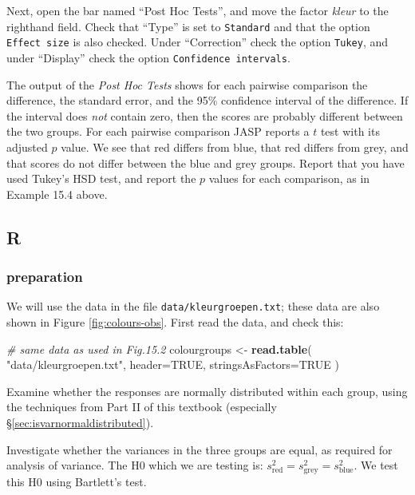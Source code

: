 \documentclass[
]{book}
\newenvironment{Shaded}{\begin{snugshade}}{\end{snugshade}}
\newcommand{\CommentTok}[1]{\textcolor[rgb]{0.56,0.35,0.01}{\textit{#1}}}
\newcommand{\DataTypeTok}[1]{\textcolor[rgb]{0.13,0.29,0.53}{#1}}
\newcommand{\KeywordTok}[1]{\textcolor[rgb]{0.13,0.29,0.53}{\textbf{#1}}}
\newcommand{\NormalTok}[1]{#1}
\newcommand{\OtherTok}[1]{\textcolor[rgb]{0.56,0.35,0.01}{#1}}
\newcommand{\StringTok}[1]{\textcolor[rgb]{0.31,0.60,0.02}{#1}}
\begin{document}
Next, open the bar named ``Post Hoc Tests'', and move the factor \emph{kleur} to the righthand field.
Check that ``Type'' is set to \texttt{Standard} and that the option \texttt{Effect\ size} is also checked.
Under ``Correction'' check the option \texttt{Tukey}, and under ``Display'' check the option \texttt{Confidence\ intervals}.

The output of the \emph{Post Hoc Tests} shows for each pairwise comparison the difference, the standard error, and the 95\% confidence interval of the difference. If the interval does \emph{not} contain zero, then the scores are probably different between the two groups. For each pairwise comparison JASP reports a \(t\) test with its adjusted \(p\) value. We see that red differs from blue, that red differs from grey, and that scores do not differ between the blue and grey groups. Report that you have used Tukey's HSD test, and report the \(p\) values for each comparison, as in Example 15.4 above.

\hypertarget{r-14}{%
\subsection{R}\label{r-14}}

\hypertarget{preparation-3}{%
\subsubsection{preparation}\label{preparation-3}}

We will use the data in the file \texttt{data/kleurgroepen.txt}; these data are also shown in Figure \ref{fig:colours-obs}. First read the data, and check this:

\begin{Shaded}
\begin{Highlighting}[]
\CommentTok{\# same data as used in Fig.15.2}
\NormalTok{colourgroups \textless{}{-}}\StringTok{ }\KeywordTok{read.table}\NormalTok{( }\StringTok{"data/kleurgroepen.txt"}\NormalTok{, }
                            \DataTypeTok{header=}\OtherTok{TRUE}\NormalTok{, }\DataTypeTok{stringsAsFactors=}\OtherTok{TRUE}\NormalTok{ )}
\end{Highlighting}
\end{Shaded}

Examine whether the responses are normally distributed within each group, using
the techniques from Part II of this textbook (especially
§\ref{sec:isvarnormaldistributed}).

Investigate whether the variances in the three groups are equal, as required
for analysis of variance. The H0 which we are testing is:
\(s^2_\textrm{red} = s^2_\textrm{grey} = s^2_\textrm{blue}\). We
test this H0 using Bartlett's test.
\end{document}
